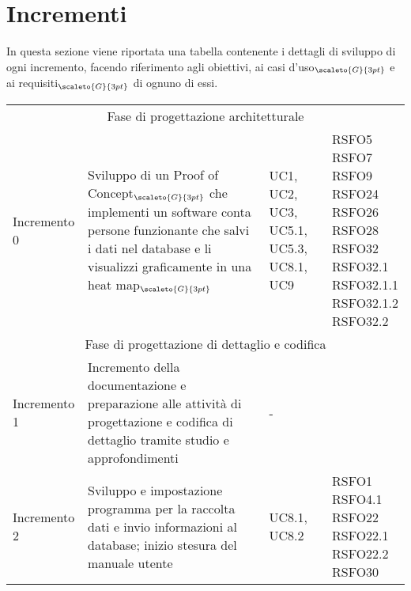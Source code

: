 \section{Incrementi}\label{ModelloDiSviluppoIncrementi}
In questa sezione viene riportata una tabella contenente i dettagli di sviluppo di ogni incremento, facendo riferimento agli obiettivi, ai casi d'uso$_{\scaleto{G}{3pt}}$ e ai requisiti$_{\scaleto{G}{3pt}}$ di ognuno di essi.
\begin{center}
	\renewcommand{\arraystretch}{1.4}
	\begin{longtable}[c]{p{3cm}|p{5cm}|p{4cm}|p{3cm}}
		\hline
		\rowcolor{airforceblue}
		\makecell[c]{\textbf{Incremento}} & \makecell[c]{\textbf{Obiettivi}} & \makecell[c]{\textbf{Casi d'uso}} &  \makecell[c]{\textbf{Requisiti}}\\
		\hline
		\multicolumn{4}{|c|}{Fase di progettazione architetturale}\\
		\hline
		\centering Incremento 0 & \centering Sviluppo di un
		Proof of Concept$_{\scaleto{G}{3pt}}$ che implementi un software conta persone funzionante che salvi i dati nel database e li visualizzi graficamente in una heat map$_{\scaleto{G}{3pt}}$ & \centering  UC1, UC2, UC3, UC5.1, UC5.3, UC8.1, UC9 & \makecell[tc]{RSFO5 \\ RSFO7 \\ RSFO9 \\ RSFO24 \\ RSFO26 \\ RSFO28 \\ RSFO32 \\ RSFO32.1 \\ RSFO32.1.1 \\ RSFO32.1.2 \\ RSFO32.2} \\
		\hline
		\multicolumn{4}{|c|}{Fase di progettazione di dettaglio e codifica}\\
		\hline
		\centering Incremento 1 & \centering Incremento della documentazione e preparazione alle attività di progettazione e codifica di dettaglio tramite studio e approfondimenti & \centering - & \makecell[tc]{-} \\
		\hline
		\centering Incremento 2 & \centering Sviluppo e impostazione programma per la raccolta dati e invio informazioni al database; inizio stesura del manuale utente & \centering UC8.1, UC8.2 & \makecell[tc]{RSFO1 \\ RSFO4.1 \\ RSFO22 \\ RSFO22.1 \\ RSFO22.2 \\ RSFO30} \\

\end{longtable}
\end{center}
